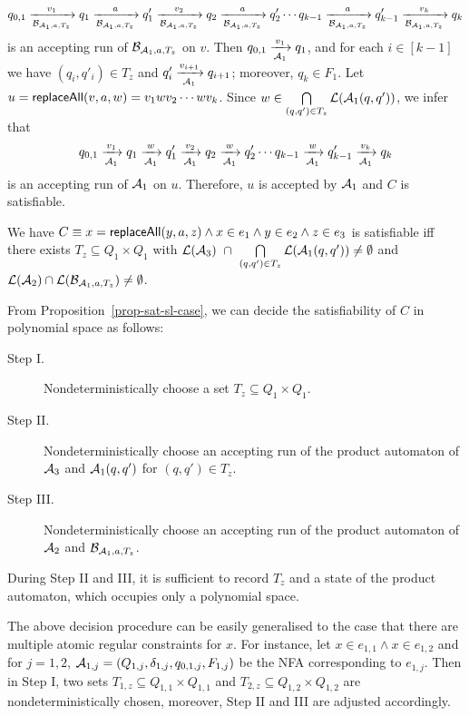 $$
q_{0,1} \xrightarrow[\mathcal{B}_{\mathcal{A}_1,a,T_z}]{v_1} q_1 \xrightarrow[\mathcal{B}_{\mathcal{A}_1,a,T_z}]{a} q'_1 \xrightarrow[\mathcal{B}_{\mathcal{A}_1,a,T_z}]{v_2} q_2 \xrightarrow[\mathcal{B}_{\mathcal{A}_1,a,T_z}]{a} q'_2 \cdots q_{k-1} \xrightarrow[\mathcal{B}_{\mathcal{A}_1,a,T_z}]{a} q'_{k-1} \xrightarrow[\mathcal{B}_{\mathcal{A}_1,a,T_z}]{v_k} q_k
$$
is an accepting run of $\mathcal{B}_{\mathcal{A}_1,a,T_z}$ on $v$. Then $q_{0,1} \xrightarrow[\mathcal{A}_1]{v_1} q_1$, and for each $i \in [k-1]$ we have $(q_i, q'_i) \in T_z$ and $q'_i \xrightarrow[\mathcal{A}_1]{v_{i+1}} q_{i+1}$; moreover, $q_k \in F_1$.
Let $u = \mathsf{replaceAll}(v, a, w)=v_1 w v_2 \cdots w v_k$. Since $w \in \bigcap \limits_{(q, q') \in T_z} \mathcal{L}(\mathcal{A}_1(q, q'))$,  we infer that
$$
q_{0,1} \xrightarrow[\mathcal{A}_1]{v_1} q_1 \xrightarrow[\mathcal{A}_1]{w} q'_1 \xrightarrow[\mathcal{A}_1]{v_2} q_2 \xrightarrow[\mathcal{A}_1]{w} q'_2 \cdots q_{k-1} \xrightarrow[\mathcal{A}_1]{w} q'_{k-1} \xrightarrow[\mathcal{A}_1]{v_k} q_k
$$
is an accepting run of $\mathcal{A}_1$ on $u$. Therefore, $u$ is accepted by $\mathcal{A}_1$ and $C$ is satisfiable.

\begin{proposition}\label{prop-sat-sl-case}
We have $C \equiv x = \mathsf{replaceAll}(y, a, z) \wedge x \in e_1 \wedge y \in e_2 \wedge z \in e_3$ is satisfiable iff there exists $T_{z} \subseteq Q_1 \times Q_1$ with $\mathcal{L}(\mathcal{A}_3)\ \cap\ \bigcap \limits_{(q, q') \in T_z} \mathcal{L}(\mathcal{A}_1(q, q')) \neq \emptyset$ and $ \mathcal{L}(\mathcal{A}_2) \cap \mathcal{L}(\mathcal{B}_{\mathcal{A}_1,a,T_z}) \neq \emptyset$.
\end{proposition}

From Proposition~\ref{prop-sat-sl-case}, we can decide the satisfiability of $C$ in polynomial space as follows:
\begin{description}
\item[Step I.] Nondeterministically choose a set $T_{z} \subseteq Q_1 \times Q_1$.
%
\item[Step II.] Nondeterministically choose an accepting run of the product automaton of $\mathcal{A}_3$ and $\mathcal{A}_1(q, q')$ for $(q,q') \in T_{z}$.
%
\item[Step III.] Nondeterministically choose an accepting run of the product automaton of $\mathcal{A}_2$ and $\mathcal{B}_{\mathcal{A}_1, a,  T_{z}}$.
\end{description}
During Step II and III, it is sufficient to record $T_z$ and a state of the product automaton, which occupies only a polynomial space.

The above decision procedure can be easily generalised to the case that there are multiple atomic regular constraints for $x$. For instance, let $x \in e_{1,1} \wedge x \in e_{1,2}$ and for $j = 1, 2$, $\mathcal{A}_{1,j} = (Q_{1,j}, \delta_{1, j}, q_{0,1, j}, F_{1,j})$ be
the NFA corresponding to $e_{1,j}$. Then in Step I, two sets $T_{1,z} \subseteq Q_{1,1} \times Q_{1,1}$ and $T_{2,z} \subseteq Q_{1,2} \times Q_{1,2}$ are nondeterministically chosen, moreover, Step II and III are adjusted accordingly.

